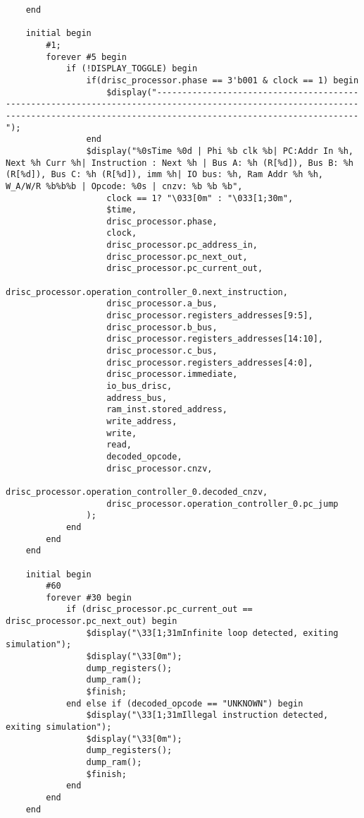\begin{lstlisting}
    end

    initial begin
        #1;
        forever #5 begin
            if (!DISPLAY_TOGGLE) begin
                if(drisc_processor.phase == 3'b001 & clock == 1) begin
                    $display("------------------------------------------------------------------------------------------------------------------------------------------------------------------------------------");
                end
                $display("%0sTime %0d | Phi %b clk %b| PC:Addr In %h, Next %h Curr %h| Instruction : Next %h | Bus A: %h (R[%d]), Bus B: %h (R[%d]), Bus C: %h (R[%d]), imm %h| IO bus: %h, Ram Addr %h %h, W_A/W/R %b%b%b | Opcode: %0s | cnzv: %b %b %b", 
                    clock == 1? "\033[0m" : "\033[1;30m",
                    $time,
                    drisc_processor.phase,
                    clock,
                    drisc_processor.pc_address_in,
                    drisc_processor.pc_next_out,
                    drisc_processor.pc_current_out,
                    drisc_processor.operation_controller_0.next_instruction,
                    drisc_processor.a_bus,
                    drisc_processor.registers_addresses[9:5],
                    drisc_processor.b_bus,
                    drisc_processor.registers_addresses[14:10],
                    drisc_processor.c_bus,
                    drisc_processor.registers_addresses[4:0],
                    drisc_processor.immediate,
                    io_bus_drisc,
                    address_bus,
                    ram_inst.stored_address,
                    write_address,
                    write,
                    read,
                    decoded_opcode,
                    drisc_processor.cnzv,
                    drisc_processor.operation_controller_0.decoded_cnzv,
                    drisc_processor.operation_controller_0.pc_jump
                );
            end        
        end
    end
    
    initial begin
        #60
        forever #30 begin
            if (drisc_processor.pc_current_out == drisc_processor.pc_next_out) begin
                $display("\33[1;31mInfinite loop detected, exiting simulation");
                $display("\33[0m");
                dump_registers();
                dump_ram();
                $finish;
            end else if (decoded_opcode == "UNKNOWN") begin
                $display("\33[1;31mIllegal instruction detected, exiting simulation");
                $display("\33[0m");
                dump_registers();
                dump_ram();
                $finish;
            end
        end
    end


\end{lstlisting}
